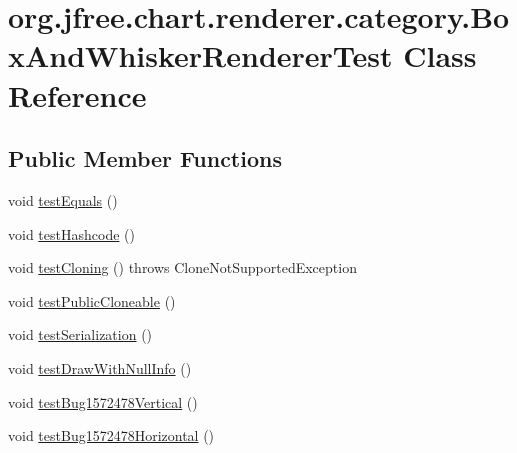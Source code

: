 \hypertarget{classorg_1_1jfree_1_1chart_1_1renderer_1_1category_1_1_box_and_whisker_renderer_test}{}\section{org.\+jfree.\+chart.\+renderer.\+category.\+Box\+And\+Whisker\+Renderer\+Test Class Reference}
\label{classorg_1_1jfree_1_1chart_1_1renderer_1_1category_1_1_box_and_whisker_renderer_test}
\subsection*{Public Member Functions}
\begin{DoxyCompactItemize}
\item 
void \mbox{\hyperlink{classorg_1_1jfree_1_1chart_1_1renderer_1_1category_1_1_box_and_whisker_renderer_test_af846065438826cbe73f0df61e936c17d}{test\+Equals}} ()
\item 
void \mbox{\hyperlink{classorg_1_1jfree_1_1chart_1_1renderer_1_1category_1_1_box_and_whisker_renderer_test_a92102ab037a696507cb97d0272fcdea9}{test\+Hashcode}} ()
\item 
void \mbox{\hyperlink{classorg_1_1jfree_1_1chart_1_1renderer_1_1category_1_1_box_and_whisker_renderer_test_afb1f6d14a0c9afe1f3528250c21e61e8}{test\+Cloning}} ()  throws Clone\+Not\+Supported\+Exception 
\item 
void \mbox{\hyperlink{classorg_1_1jfree_1_1chart_1_1renderer_1_1category_1_1_box_and_whisker_renderer_test_a05d6165881a9933e2f3bd898b5de9524}{test\+Public\+Cloneable}} ()
\item 
void \mbox{\hyperlink{classorg_1_1jfree_1_1chart_1_1renderer_1_1category_1_1_box_and_whisker_renderer_test_a0957cac604a45b57d710ecc4ac5643f5}{test\+Serialization}} ()
\item 
void \mbox{\hyperlink{classorg_1_1jfree_1_1chart_1_1renderer_1_1category_1_1_box_and_whisker_renderer_test_a8f235670f2d0dab60e674d9f6d1d78f5}{test\+Draw\+With\+Null\+Info}} ()
\item 
void \mbox{\hyperlink{classorg_1_1jfree_1_1chart_1_1renderer_1_1category_1_1_box_and_whisker_renderer_test_ade90cbac25f79e62eef659053f0b6da5}{test\+Bug1572478\+Vertical}} ()
\item 
void \mbox{\hyperlink{classorg_1_1jfree_1_1chart_1_1renderer_1_1category_1_1_box_and_whisker_renderer_test_ab110e6ef5430c244b168001d7cced578}{test\+Bug1572478\+Horizontal}} ()

\end{DoxyCompactItemize}
